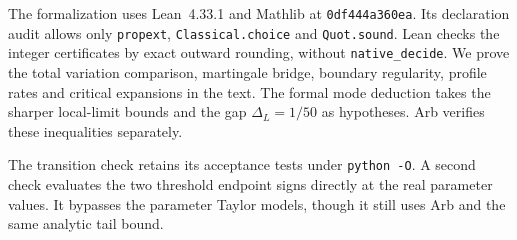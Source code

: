 The formalization uses Lean~4.33.1 and Mathlib at \texttt{0df444a360ea}.
Its declaration audit allows only \texttt{propext},
\texttt{Classical.choice} and \texttt{Quot.sound}.
Lean checks the integer certificates by exact outward rounding,
without \texttt{native\_decide}. We prove the total variation comparison,
martingale bridge, boundary regularity, profile rates and critical expansions
in the text. The formal mode deduction takes the sharper local-limit
bounds and the gap $\Delta_L=1/50$ as hypotheses. Arb verifies these
inequalities separately.

The transition check retains its acceptance tests under
\texttt{python -O}. A second check evaluates the two threshold endpoint
signs directly at the real parameter values. It bypasses the parameter
Taylor models, though it still uses Arb and the same analytic tail bound.
